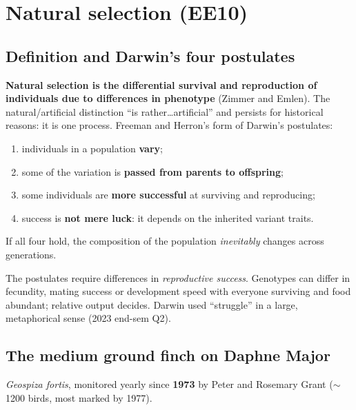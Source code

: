 \section{Natural selection (EE10)}

\subsection{Definition and Darwin's four postulates}
\textbf{Natural selection is the differential survival and reproduction of individuals due to differences in
phenotype} (Zimmer and Emlen). The natural/artificial distinction ``is rather\dots artificial'' and persists for
historical reasons: it is one process. Freeman and Herron's form of Darwin's postulates:
\begin{enumerate}
\item individuals in a population \textbf{vary};
\item some of the variation is \textbf{passed from parents to offspring};
\item some individuals are \textbf{more successful} at surviving and reproducing;
\item success is \textbf{not mere luck}: it depends on the inherited variant traits.
\end{enumerate}
If all four hold, the composition of the population \emph{inevitably} changes across generations.

\begin{keyidea}
The postulates require differences in \emph{reproductive success}. Genotypes can differ in fecundity, mating success or
development speed with everyone surviving and food abundant; relative output decides. Darwin used ``struggle'' in a
large, metaphorical sense (2023 end-sem Q2).
\end{keyidea}

\subsection{The medium ground finch on Daphne Major}
\emph{Geospiza fortis}, monitored yearly since \textbf{1973} by Peter and Rosemary Grant ($\sim$1200 birds, most marked by 1977).

